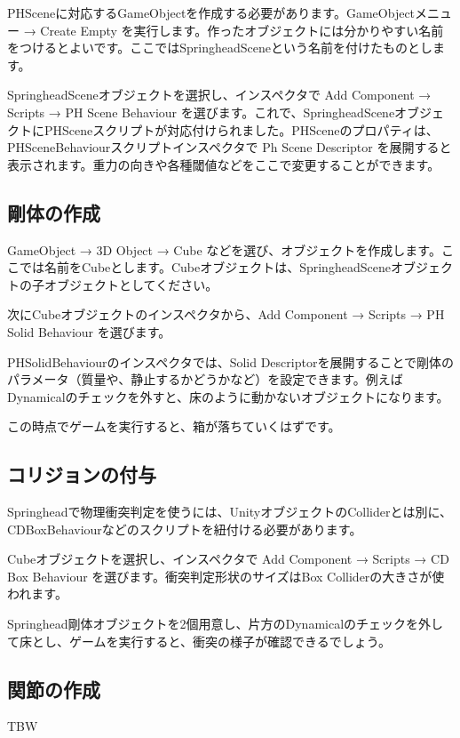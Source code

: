 PHSceneに対応するGameObjectを作成する必要があります。GameObjectメニュー → Create Empty を実行します。作ったオブジェクトには分かりやすい名前をつけるとよいです。ここではSpringheadSceneという名前を付けたものとします。

SpringheadSceneオブジェクトを選択し、インスペクタで Add Component → Scripts → PH Scene Behaviour を選びます。これで、SpringheadSceneオブジェクトにPHSceneスクリプトが対応付けられました。PHSceneのプロパティは、PHSceneBehaviourスクリプトインスペクタで Ph Scene Descriptor を展開すると表示されます。重力の向きや各種閾値などをここで変更することができます。


\subsection{剛体の作成}

GameObject → 3D Object → Cube などを選び、オブジェクトを作成します。ここでは名前をCubeとします。Cubeオブジェクトは、SpringheadSceneオブジェクトの子オブジェクトとしてください。

\KLUDGE 次にCubeオブジェクトのインスペクタから、Add Component → Scripts → PH Solid Behaviour を選びます。

PHSolidBehaviourのインスペクタでは、Solid Descriptorを展開することで剛体のパラメータ（質量や、静止するかどうかなど）を設定できます。例えばDynamicalのチェックを外すと、床のように動かないオブジェクトになります。

\KLUDGE この時点でゲームを実行すると、箱が落ちていくはずです。


\subsection{コリジョンの付与}

Springheadで物理衝突判定を使うには、UnityオブジェクトのColliderとは別に、CDBoxBehaviourなどのスクリプトを紐付ける必要があります。

Cubeオブジェクトを選択し、インスペクタで Add Component → Scripts → CD Box Behaviour を選びます。衝突判定形状のサイズはBox Colliderの大きさが使われます。

Springhead剛体オブジェクトを2個用意し、片方のDynamicalのチェックを外して床とし、ゲームを実行すると、衝突の様子が確認できるでしょう。


\subsection{関節の作成}

TBW


